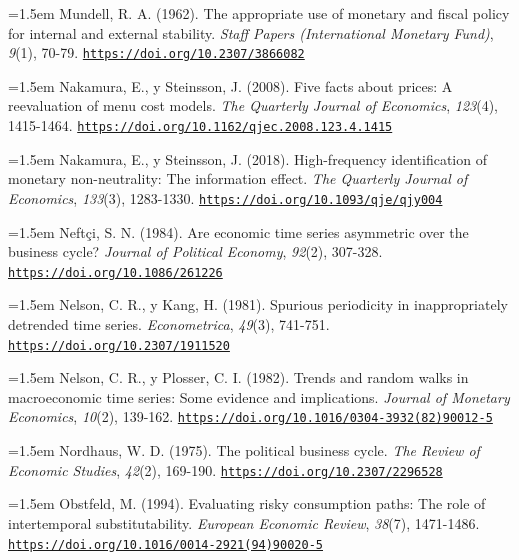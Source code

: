 \documentclass[10pt,a4paper]{article}
\begin{document}
{\sloppy\noindent\hangindent=1.5em Mundell, R. A. (1962). The appropriate use of monetary and fiscal policy for internal and external stability. \textit{Staff Papers (International Monetary Fund)}, \textit{9}(1), 70-79. \href{https://doi.org/10.2307/3866082}{\nolinkurl{https://doi.org/10.2307/3866082}}\par}

\noindent\hangindent=1.5em Nakamura, E., y Steinsson, J. (2008). Five facts about prices: A reevaluation of menu cost models. \textit{The Quarterly Journal of Economics}, \textit{123}(4), 1415-1464. \href{https://doi.org/10.1162/qjec.2008.123.4.1415}{\nolinkurl{https://doi.org/10.1162/qjec.2008.123.4.1415}}

\noindent\hangindent=1.5em Nakamura, E., y Steinsson, J. (2018). High-frequency identification of monetary non-neutrality: The information effect. \textit{The Quarterly Journal of Economics}, \textit{133}(3), 1283-1330. \href{https://doi.org/10.1093/qje/qjy004}{\nolinkurl{https://doi.org/10.1093/qje/qjy004}}

\noindent\hangindent=1.5em Neftçi, S. N. (1984). Are economic time series asymmetric over the business cycle? \textit{Journal of Political Economy}, \textit{92}(2), 307-328. \href{https://doi.org/10.1086/261226}{\nolinkurl{https://doi.org/10.1086/261226}}

\noindent\hangindent=1.5em Nelson, C. R., y Kang, H. (1981). Spurious periodicity in inappropriately detrended time series. \textit{Econometrica}, \textit{49}(3), 741-751. \href{https://doi.org/10.2307/1911520}{\nolinkurl{https://doi.org/10.2307/1911520}}

\noindent\hangindent=1.5em Nelson, C. R., y Plosser, C. I. (1982). Trends and random walks in macroeconomic time series: Some evidence and implications. \textit{Journal of Monetary Economics}, \textit{10}(2), 139-162. \href{https://doi.org/10.1016/0304-3932(82)90012-5}{\nolinkurl{https://doi.org/10.1016/0304-3932(82)90012-5}}

\noindent\hangindent=1.5em Nordhaus, W. D. (1975). The political business cycle. \textit{The Review of Economic Studies}, \textit{42}(2), 169-190. \href{https://doi.org/10.2307/2296528}{\nolinkurl{https://doi.org/10.2307/2296528}}

\noindent\hangindent=1.5em Obstfeld, M. (1994). Evaluating risky consumption paths: The role of intertemporal substitutability. \textit{European Economic Review}, \textit{38}(7), 1471-1486. \href{https://doi.org/10.1016/0014-2921(94)90020-5}{\nolinkurl{https://doi.org/10.1016/0014-2921(94)90020-5}}
\end{document}
